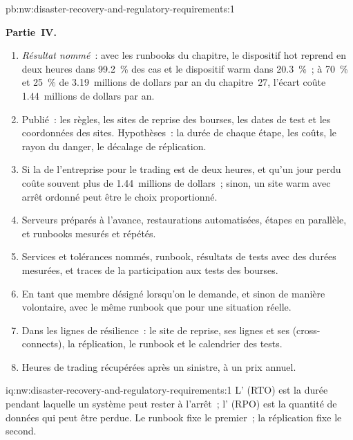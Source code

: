 \begin{solution}{pb:nw:disaster-recovery-and-regulatory-requirements:1}
\begin{enumerate}[resume]
\end{enumerate}
\textbf{Partie~IV.}
\begin{enumerate}[resume]
\item \emph{Résultat nommé}~: avec les runbooks du chapitre, le dispositif hot reprend en deux heures dans 99.2~\% des cas et le dispositif warm
  dans 20.3~\%~; à 70~\% et 25~\% de 3.19~millions de dollars par an du chapitre~27, l'écart coûte 1.44~millions de dollars par an.
\item Publié~: les règles, les sites de reprise des bourses, les dates de test et les coordonnées des sites. Hypothèses~: la durée de chaque étape, les coûts,
  le rayon du danger, le décalage de réplication.
\item Si la  de l'entreprise pour le trading est de deux heures, et qu'un jour perdu coûte souvent plus de 1.44~millions de dollars~;
  sinon, un site warm avec arrêt ordonné peut être le choix proportionné.
\item Serveurs préparés à l'avance, restaurations automatisées, étapes en parallèle, et runbooks mesurés et répétés.
\item Services et tolérances nommés, runbook, résultats de tests avec des durées mesurées, et traces de la participation aux tests des bourses.
\item En tant que membre désigné lorsqu'on le demande, et sinon de manière volontaire, avec le même runbook que pour une situation réelle.
\item Dans les lignes de résilience~: le site de reprise, ses lignes et ses  (cross-connects), la réplication, le runbook et le calendrier des tests.
\item Heures de trading récupérées après un sinistre, à un prix annuel.
\end{enumerate}
\end{solution}

\begin{solution}{iq:nw:disaster-recovery-and-regulatory-requirements:1}
L' (RTO) est la durée pendant laquelle un système peut rester à l'arrêt~; l' (RPO)
est la quantité de données qui peut être perdue. Le runbook fixe le premier~; la réplication fixe le second.
\end{solution}

